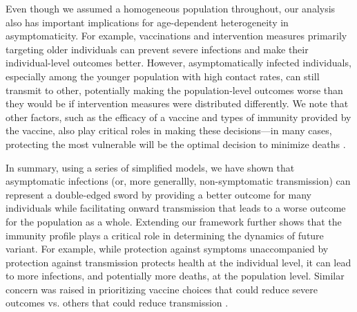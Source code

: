 \documentclass[12pt]{article}
\begin{document}
Even though we assumed a homogeneous population throughout, our analysis also has important implications for age-dependent heterogeneity in asymptomaticity.
For example, vaccinations and intervention measures primarily targeting older individuals can prevent severe infections and make their individual-level outcomes better.
However, asymptomatically infected individuals, especially among the younger population with high contact rates, can still transmit to other, potentially making the population-level outcomes worse than they would be if intervention measures were distributed differently.
We note that other factors, such as the efficacy of a vaccine and types of immunity provided by the vaccine, also play critical roles in making these decisions---in many cases, protecting the most vulnerable will be the optimal decision to minimize deaths \citep{moore2021modelling}.

In summary, using a series of simplified models, we have shown that asymptomatic infections (or, more generallly, non-symptomatic transmission) can represent a double-edged sword by providing a better outcome for many individuals while facilitating onward transmission that leads to a worse outcome for the population as a whole.
Extending our framework further shows that the immunity profile plays a critical role in determining the dynamics of future variant. 
For example, while protection against symptoms unaccompanied by protection against transmission protects health at the individual level, it can lead to more infections, and potentially more deaths, at the population level.
Similar concern was raised in prioritizing vaccine choices that could reduce severe outcomes vs. others that could reduce transmission \citep{koelle2022changing}.
\end{document}
